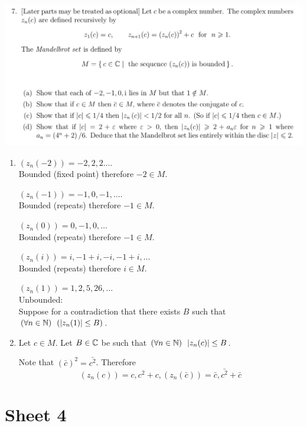 \documentclass[12pt]{article}
\begin{document}
\subsection{}
\begin{mdframed}
\includegraphics[width=400pt]{img/oxford-M2-analysis-I-3-7.png}
\end{mdframed}
\begin{enumerate}[label=(\alph*)]
\item
  $(z_n(-2)) = -2, 2, 2 \ldots$.\\
  Bounded (fixed point) therefore $-2 \in M$.

  $(z_n(-1)) = -1, 0, -1, \ldots$.\\
  Bounded (repeats) therefore $-1 \in M$.

  $(z_n(0)) = 0, -1, 0, \ldots$\\
  Bounded (repeats) therefore $-1 \in M$.

  $(z_n(i)) = i, -1 + i, -i, -1 + i, \ldots$\\
  Bounded (repeats) therefore $i \in M$.

  $(z_n(1)) = 1, 2, 5, 26, \ldots$\\
  Unbounded:\\
  Suppose for a contradiction that there exists $B$ such that
  $(\forall n \in \mathbb{N}) ~~ (|z_n(1)| \leq B)$. 

\item
  Let $c \in M$. Let $B \in \mathbb{C}$ be such that $(\forall n \in \mathbb{N}) ~~ |z_n(c)| \leq B$.

  Note that $(\bar c)^2 = \bar{c^2}$. Therefore
  \[
    (z_n(c)) = c, c^2 + c,
    (z_n(\bar c)) = \bar c, \bar{c^2} + \bar{c}
  \]
\end{enumerate}


\newpage
\section{Sheet 4}
\end{document}
